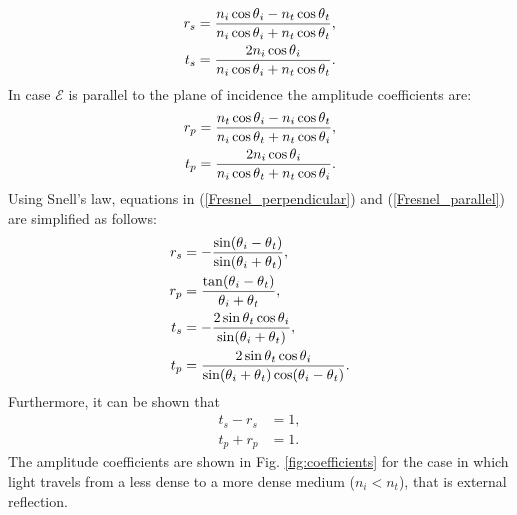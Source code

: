 \begin{equation} \label{Fresnel_perpendicular}
\begin{split}
r_{s} & = \frac{n_i\cos\mbox{$\theta$}_i-n_t \cos\mbox{$\theta$}_t}{n_i \cos\mbox{$\theta$}_i+n_t\cos\mbox{$\theta$}_t},\\
t_{s} & =  \frac{2n_i\cos\mbox{$\theta$}_i}{n_i\cos\mbox{$\theta$}_i+n_t\cos\mbox{$\theta$}_t}.
\end{split}
\end{equation}
In case $\boldsymbol{\mathcal{E}}$ is parallel to the plane of incidence the amplitude coefficients are:
\begin{equation}\label{Fresnel_parallel}
\begin{split}
r_{p} & = \frac{n_t\cos\mbox{$\theta$}_i-n_i \cos\mbox{$\theta$}_t}{n_i \cos\mbox{$\theta$}_t+n_t\cos\mbox{$\theta$}_i},\\
t_{p} & =  \frac{2n_i\cos\mbox{$\theta$}_i}{n_i\cos\mbox{$\theta$}_t+n_t\cos\mbox{$\theta$}_i}.
\end{split}
\end{equation}
Using Snell's law, equations in (\ref{Fresnel_perpendicular}) and (\ref{Fresnel_parallel}) are simplified as follows:
\begin{equation} \label{simple_Fresnel}
\begin{split}
r_{s} & = -\frac{\sin(\mbox{$\theta$}_i-\mbox{$\theta$}_t)}{\sin(\mbox{$\theta$}_i+\mbox{$\theta$}_t)},\\
r_{p} & =  \frac{\tan(\mbox{$\theta$}_i-\mbox{$\theta$}_t)}{\mbox{$\theta$}_i+\mbox{$\theta$}_t},\\
t_{s} & = -\frac{2\sin \mbox{$\theta$}_t \cos \mbox{$\theta$}_i}{\sin(\mbox{$\theta$}_i+\mbox{$\theta$}_t)},\\
t_{p} & = \frac{2\sin \mbox{$\theta$}_t \cos \mbox{$\theta$}_i}{\sin(\mbox{$\theta$}_i+\mbox{$\theta$}_t)\cos(\mbox{$\theta$}_i- \mbox{$\theta$}_t)}.
\end{split}
\end{equation}
Furthermore, it can be shown that
 \begin{equation}
\begin{split}
t_s-r_s &= 1, \\
t_p+r_p &=  1.
\end{split}
\end{equation}
The amplitude coefficients are shown in Fig. \ref{fig:coefficients} for the case in which light travels from a less dense to a more dense medium ($n_i<n_t$), that is external reflection. 

